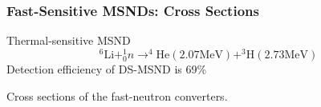 \documentclass[fleqn]{beamer}
\begin{document}
 \begin{frame}
  \frametitle{Fast-Sensitive MSNDs: Cross Sections}
  \begin{block}{Thermal-sensitive MSND}
     \begin{equation*}
      ^6 \mbox{Li} + _0^1 n \rightarrow ^4\mbox{He} (2.07 \mbox{MeV}) + ^3\mbox{H}(2.73 \mbox{MeV})
     \end{equation*}
    Detection efficiency of DS-MSND is 69\% \cite{ochs2018improved}
    \end{block}
    
    \begin{block}{Cross sections of the fast-neutron converters.}
    \end{block}
 \end{frame}
 
\end{document}
